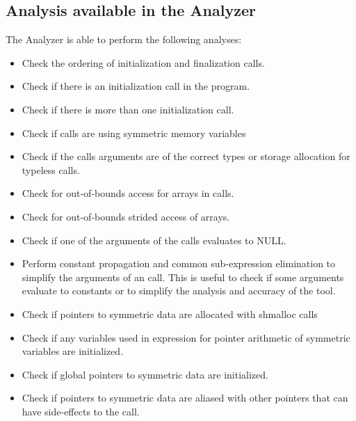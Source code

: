 \begin{minipage}{\linewidth}

  \subsection{Analysis available in the \openshmem Analyzer}

  The \openshmem Analyzer is able to perform the following analyses:

  \vspace{0.1in}

  \begin{itemize}
  \item Check the ordering of \openshmem initialization and
    finalization calls.
  \item Check if there is an \openshmem initialization call in the
    program.
  \item Check if there is more than one \openshmem initialization
    call.
  \item Check if \openshmem calls are using symmetric memory variables
  \item Check if the \openshmem calls arguments are of the correct
    types or storage allocation for \openshmem typeless calls.
  \item Check for out-of-bounds access for arrays in \openshmem calls.
  \item Check for out-of-bounds strided access of arrays.
  \item Check if one of the arguments of the \openshmem calls
    evaluates to NULL.
  \item Perform constant propagation and common sub-expression
    elimination to simplify the arguments of an \openshmem call. This
    is useful to check if some arguments evaluate to constants or to
    simplify the analysis and accuracy of the tool.
  \item Check if pointers to symmetric data are allocated with
    shmalloc calls
  \item Check if any variables used in expression for pointer
    arithmetic of symmetric variables are initialized.
  \item Check if global pointers to symmetric data are initialized.
  \item Check if pointers to symmetric data are aliased with other
    pointers that can have side-effects to the \openshmem call.
  \end{itemize}

\end{minipage}


